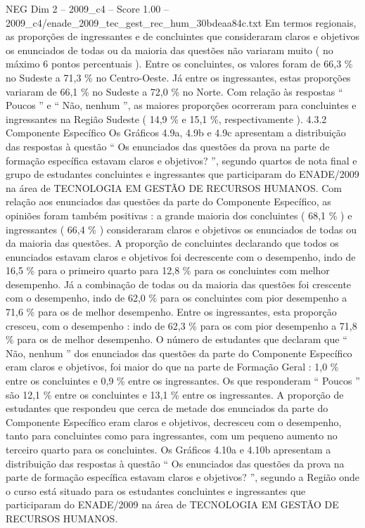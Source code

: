 \begin{textsample}{NEG Dim 2 – 2009\_c4 – Score 1.00 – 2009\_c4/enade\_2009\_tec\_gest\_rec\_hum\_30bdeaa84c.txt}
Em termos regionais, as proporções de ingressantes e de concluintes que consideraram claros e objetivos os enunciados de todas ou da maioria das questões não variaram muito ( no máximo 6 pontos percentuais ).
Entre os concluintes, os valores foram de 66,3 \% no Sudeste a 71,3 \% no Centro-Oeste.
Já entre os ingressantes, estas proporções variaram de 66,1 \% no Sudeste a 72,0 \% no Norte.
Com relação às respostas “ Poucos ” e “ Não, nenhum ”, as maiores proporções ocorreram para concluintes e ingressantes na Região Sudeste ( 14,9 \% e 15,1 \%, respectivamente ). 4.3.2 Componente Específico Os Gráficos 4.9a, 4.9b e 4.9c apresentam a distribuição das respostas à questão “ Os enunciados das questões da prova na parte de formação específica estavam claros e objetivos? ”, segundo quartos de nota final e grupo de estudantes concluintes e ingressantes que participaram do ENADE/2009 na área de TECNOLOGIA EM GESTÃO DE RECURSOS HUMANOS.
Com relação aos enunciados das questões da parte do Componente Específico, as opiniões foram também positivas : a grande maioria dos concluintes ( 68,1 \% ) e ingressantes ( 66,4 \% ) consideraram claros e objetivos os enunciados de todas ou da maioria das questões.
A proporção de concluintes declarando que todos os enunciados estavam claros e objetivos foi decrescente com o desempenho, indo de 16,5 \% para o primeiro quarto para 12,8 \% para os concluintes com melhor desempenho.
Já a combinação de todas ou da maioria das questões foi crescente com o desempenho, indo de 62,0 \% para os concluintes com pior desempenho a 71,6 \% para os de melhor desempenho.
Entre os ingressantes, esta proporção cresceu, com o desempenho : indo de 62,3 \% para os com pior desempenho a 71,8 \% para os de melhor desempenho.
O número de estudantes que declaram que “ Não, nenhum ” dos enunciados das questões da parte do Componente Específico eram claros e objetivos, foi maior do que na parte de Formação Geral : 1,0 \% entre os concluintes e 0,9 \% entre os ingressantes.
Os que responderam “ Poucos ” são 12,1 \% entre os concluintes e 13,1 \% entre os ingressantes.
A proporção de estudantes que respondeu que cerca de metade dos enunciados da parte do Componente Específico eram claros e objetivos, decresceu com o desempenho, tanto para concluintes como para ingressantes, com um pequeno aumento no terceiro quarto para os concluintes.
Os Gráficos 4.10a e 4.10b apresentam a distribuição das respostas à questão “ Os enunciados das questões da prova na parte de formação específica estavam claros e objetivos? ”, segundo a Região onde o curso está situado para os estudantes concluintes e ingressantes que participaram do ENADE/2009 na área de TECNOLOGIA EM GESTÃO DE RECURSOS HUMANOS.

\end{textsample}
